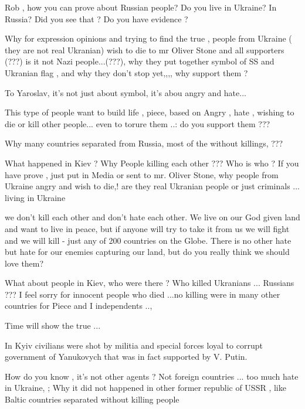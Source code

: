 \begin{itemize}
\begin{itemize}

Rob , how you can prove about Russian people? Do you live in Ukraine? In
Russia? Did you see that ? Do you have evidence ?

Why for expression opinions and trying to find the true , people from Ukraine (
they are not real Ukranian) wish to die to mr Oliver Stone and all supporters
(???) is it not Nazi people...(???), why they put together symbol of SS and
Ukranian flag , and why they don't stop yet,,,, why support them ?


To Yaroslav, it's not just about symbol, it's abou angry and hate...

This type of people want to build life , piece, based on Angry , hate , wishing
to die or kill other people... even to torure them ..: do you support them ???


Why many countries separated from Russia, most of the without killings, ???

What happened in Kiev ? Why People killing each other ??? Who is who ? If you
have prove , just put in Media or sent to mr. Oliver Stone, why people from
Ukraine angry and wish to die,! are they real Ukranian people or just criminals
... living in Ukraine


we don't kill each other and don't hate each other. We live on our God given
land and want to live in peace, but if anyone will try to take it from us we
will fight and we will kill - just any of 200 countries on the Globe. There is
no other hate but hate for our enemies capturing our land, but do you really
think we should love them?



What about people in Kiev, who were there ? Who killed Ukranians ... Russians
??? I feel sorry for innocent people who died ...no killing were in many other
countries for Piece and I independents ..,

Time will show the true ...


In Kyiv civilians were shot by militia and special forces loyal to corrupt
government of Yanukovych that was in fact supported by V. Putin.

How do you know , it's not other agents ? Not foreign countries ...
too much hate in Ukraine, ;
Why it did not happened in other former republic of
USSR , like Baltic countries separated without killing people


\end{itemize}
\end{itemize}
